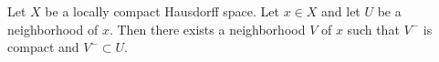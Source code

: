 Let $X$ be a locally compact Hausdorff space. Let $x \in X$ and let $U$ be a neighborhood of $x$. Then there exists a neighborhood $V$ of $x$ such that $V^-$ is compact and $V^- \subset U$.